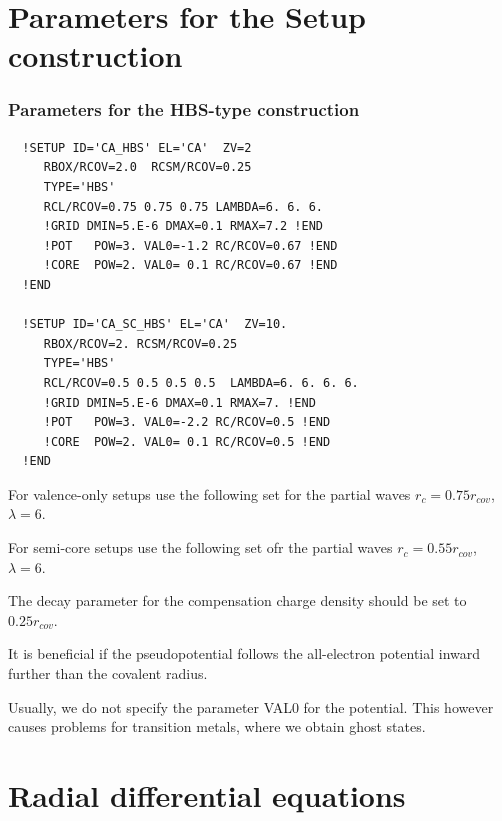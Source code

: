 \documentclass[11pt,a4paper]{report}
\begin{document}
\chapter{Parameters for the Setup construction}
\subsection{Parameters for the HBS-type construction}
\begin{verbatim}
  !SETUP ID='CA_HBS' EL='CA'  ZV=2   
     RBOX/RCOV=2.0  RCSM/RCOV=0.25     
     TYPE='HBS' 
     RCL/RCOV=0.75 0.75 0.75 LAMBDA=6. 6. 6. 
     !GRID DMIN=5.E-6 DMAX=0.1 RMAX=7.2 !END
     !POT   POW=3. VAL0=-1.2 RC/RCOV=0.67 !END
     !CORE  POW=2. VAL0= 0.1 RC/RCOV=0.67 !END
  !END

  !SETUP ID='CA_SC_HBS' EL='CA'  ZV=10.  
     RBOX/RCOV=2. RCSM/RCOV=0.25 
     TYPE='HBS'
     RCL/RCOV=0.5 0.5 0.5 0.5  LAMBDA=6. 6. 6. 6.
     !GRID DMIN=5.E-6 DMAX=0.1 RMAX=7. !END
     !POT   POW=3. VAL0=-2.2 RC/RCOV=0.5 !END
     !CORE  POW=2. VAL0= 0.1 RC/RCOV=0.5 !END
  !END
\end{verbatim}

For valence-only setups use the following set for the partial waves
$r_c=0.75 r_{cov}$, $\lambda=6$.

For semi-core setups use the following set ofr the partial waves
$r_c=0.55 r_{cov}$, $\lambda=6$.

The decay parameter for the compensation charge density should be set
to $0.25 r_{cov}$.

It is beneficial if the pseudopotential follows the all-electron
potential inward further than the covalent radius.

Usually, we do not specify the parameter VAL0 for the potential. This
however causes problems for transition metals, where we obtain ghost
states.

\chapter{Radial differential equations}
\end{document}
